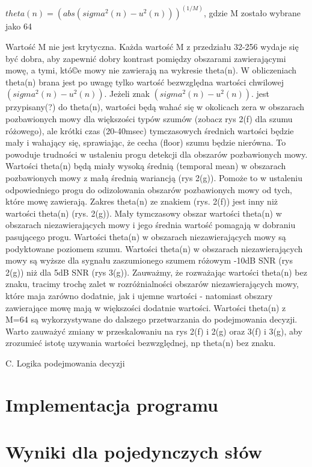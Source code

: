 \documentclass[eng,printmode]{mgr}
\begin{document}
 $theta(n) = (abs(sigma^2(n)-u^2(n)))^(1/M)$, gdzie M zostało wybrane jako 64
 
 Wartość M nie jest krytyczna. Każda wartość M z przedziału 32-256 wydaje się być dobra, aby zapewnić dobry kontrast pomiędzy obszarami zawierającymi mowę, a tymi, któ©e mowy nie zawierają na wykresie theta(n). W obliczeniach theta(n) brana jest po uwagę tylko wartość bezwzględna wartości chwilowej $(sigma^2(n) - u^2(n))$. Jeżeli znak $(sigma^2(n) - u^2(n))$. jest przypisany(?) do theta(n), wartości będą wahać się w okolicach zera w obszarach pozbawionych mowy 
 dla większości typów szumów (zobacz rys 2(f) dla szumu różowego), ale krótki czas (20-40msec) tymczasowych średnich wartości będzie mały i wahający się, sprawiając, że cecha (floor) szumu będzie nierówna. To powoduje trudności w ustaleniu progu detekcji dla obszarów pozbawionych mowy. Wartości theta(n) będą miały wysoką średnią (temporal mean) w obszarach pozbawionych mowy z małą średnią wariancją (rys 2(g)). Pomoże to w ustaleniu odpowiedniego progu do odizolowania obszarów pozbawionych mowy od tych, które mowę zawierają. Zakres theta(n) ze znakiem (rys. 2(f)) jest inny niż wartości theta(n) (rys. 2(g)). Mały tymczasowy obszar wartości theta(n) w obszarach niezawierających  mowy i jego średnia wartość pomagają w dobraniu pasującego progu. Wartości theta(n) w obszarach niezawierających mowy są podyktowane poziomem szumu. Wartości theta(n) w obszarach niezawierających mowy są wyższe dla sygnału zaszumionego szumem różowym -10dB SNR (rys 2(g)) niż dla 5dB SNR (rys 3(g)). Zauważmy, że rozważając wartości  theta(n) bez znaku, tracimy trochę zalet w rozróżnialności obszarów niezawierających mowy, które maja zarówno dodatnie, jak i ujemne wartości - natomiast obszary zawierające mowę mają w większości dodatnie wartości. Wartości theta(n) z M=64 są wykorzystywane do dalszego przetwarzania do podejmowania decyzji. Warto zauważyć zmiany w przeskalowaniu na rys 2(f) i 2(g) oraz 3(f) i 3(g), aby zrozumieć istotę uzywania wartości bezwzględnej, np theta(n) bez znaku.
 
 C. Logika podejmowania decyzji 
 

\chapter{Implementacja programu}

\chapter{Wyniki dla pojedynczych słów}
\end{document}
